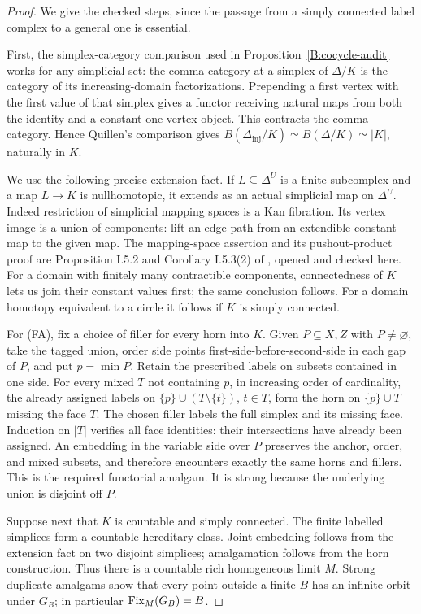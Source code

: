 \begin{proof}
We give the checked steps, since the passage from a simply
connected label complex to a general one is essential.

First, the simplex-category comparison used in
Proposition~\ref{B:cocycle-audit} works for any simplicial set:
the comma category at a simplex of $\Delta/K$ is the category
of its increasing-domain factorizations. Prepending a first
vertex with the first value of that simplex gives a functor
receiving natural maps from both the identity and a constant
one-vertex object. This contracts the comma category. Hence
Quillen's comparison gives
$B(\Delta_{\mathrm{inj}}/K)\simeq B(\Delta/K)\simeq |K|$,
naturally in $K$.

We use the following precise extension fact. If
$L\subseteq\Delta^U$ is a finite subcomplex and a map
$L\to K$ is nullhomotopic, it extends as an actual simplicial
map on $\Delta^U$. Indeed restriction of simplicial mapping
spaces is a Kan fibration. Its vertex image is a union of
components: lift an edge path from an extendible constant map
to the given map. The mapping-space assertion and its
pushout-product proof are Proposition I.5.2 and Corollary
I.5.3(2) of \cite{ABGoerssJardine}, opened and checked here.
For a domain with finitely many contractible components,
connectedness of $K$ lets us join their constant values first;
the same conclusion follows. For a domain homotopy equivalent
to a circle it follows if $K$ is simply connected.

For (FA), fix a choice of filler for every horn into $K$.
Given $P\subseteq X,Z$ with $P\ne\varnothing$, take the
tagged union, order side points first-side-before-second-side
in each gap of $P$, and put $p=\min P$. Retain the prescribed
labels on subsets contained in one side. For every mixed
$T$ not containing $p$, in increasing order of cardinality,
the already assigned labels on
$\{p\}\cup(T\setminus\{t\})$, $t\in T$, form the horn
on $\{p\}\cup T$ missing the face $T$. The chosen filler
labels the full simplex and its missing face. Induction on
$|T|$ verifies all face identities: their intersections have
already been assigned. An embedding in the variable side
over $P$ preserves the anchor, order, and mixed subsets, and
therefore encounters exactly the same horns and fillers.
This is the required functorial amalgam. It is strong because
the underlying union is disjoint off $P$.

Suppose next that $K$ is countable and simply connected.
The finite labelled simplices form a countable hereditary
class. Joint embedding follows from the extension fact on
two disjoint simplices; amalgamation follows from the horn
construction. Thus there is a countable rich homogeneous
limit $M$. Strong duplicate amalgams show that every point
outside a finite $B$ has an infinite orbit under $G_B$;
in particular $\operatorname{Fix}_M(G_B)=B$.


\end{proof}
